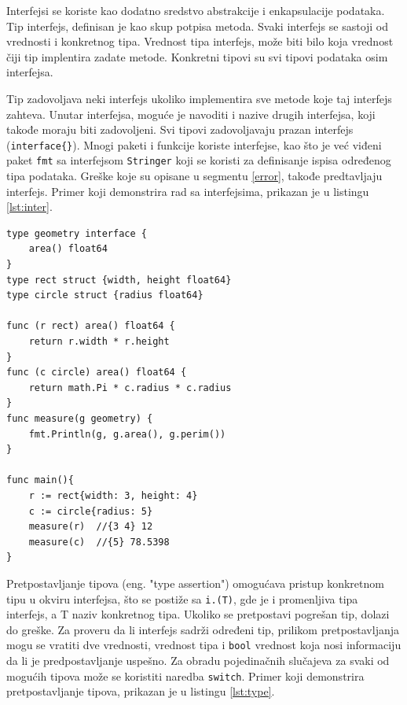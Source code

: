 \documentclass[12pt,oneside]{memoir}
\begin{document}
Interfejsi se koriste kao dodatno sredstvo abstrakcije i enkapsulacije podataka. Tip interfejs, definisan je kao skup potpisa metoda. Svaki interfejs se sastoji od vrednosti i konkretnog tipa. Vrednost tipa interfejs, može biti bilo koja vrednost čiji tip implentira zadate metode. Konkretni tipovi su svi tipovi podataka osim interfejsa.

Tip zadovoljava neki interfejs ukoliko implementira sve metode koje taj interfejs zahteva. Unutar interfejsa, moguće je navoditi i nazive drugih interfejsa, koji takođe moraju biti zadovoljeni. Svi tipovi zadovoljavaju prazan interfejs (\texttt{interface\{\}}). Mnogi paketi i funkcije koriste interfejse, kao što je već viđeni paket \texttt{fmt} sa interfejsom \texttt{Stringer} koji se koristi za definisanje ispisa određenog tipa podataka. Greške koje su opisane u segmentu \ref{error}, takođe predtavljaju interfejs. Primer koji demonstrira rad sa interfejsima, prikazan je u listingu \ref{lst:inter}.

\begin{center}
\begin{lstlisting}[caption=Primer koji demonstrira rad sa interfejsima, label={lst:inter},  backgroundcolor=\color{background}]
type geometry interface { 
	area() float64 
}
type rect struct {width, height float64}
type circle struct {radius float64}

func (r rect) area() float64 {
	return r.width * r.height
}
func (c circle) area() float64 {
	return math.Pi * c.radius * c.radius
}
func measure(g geometry) {
	fmt.Println(g, g.area(), g.perim())
}

func main(){
	r := rect{width: 3, height: 4}	
	c := circle{radius: 5}			
	measure(r)	//{3 4} 12 
  	measure(c)	//{5} 78.5398 
}
\end{lstlisting}
\end{center}

Pretpostavljanje tipova (eng. "type assertion") omogućava pristup konkretnom tipu u okviru interfejsa, što se postiže sa \texttt{i.(T)}, gde je i promenljiva tipa interfejs, a T naziv konkretnog tipa. Ukoliko se pretpostavi pogrešan tip, dolazi do greške.  Za proveru da li interfejs sadrži određeni tip, prilikom pretpostavljanja mogu se vratiti dve vrednosti, vrednost tipa i \texttt{bool} vrednost koja nosi informaciju da li je predpostavljanje uspešno. Za obradu pojedinačnih slučajeva za svaki od mogućih tipova može se koristiti naredba \texttt{switch}.  Primer koji demonstrira pretpostavljanje tipova, prikazan je u listingu \ref{lst:type}.
\end{document}
